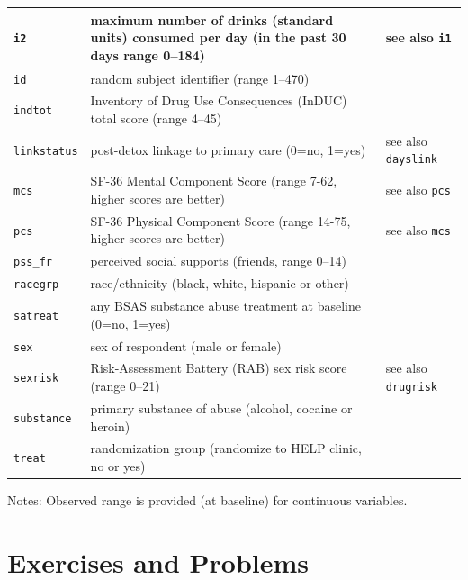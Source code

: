 \documentclass{tufte-book}\usepackage[]{graphicx}\usepackage[]{xcolor}
\renewcommand{\variable}[1]{{\color{black}\texttt{#1}}}
\begin{document}
\begin{longtable}{|p{2.1cm}|p{6.8cm}|p{3.5cm}|}
\variable{i2} & maximum number of drinks (standard units) consumed per day (in the past 30 days range 0--184) & see also \variable{i1}
\\ \hline
\variable{id} & random subject identifier (range 1--470) &
\\ \hline
\variable{indtot} & Inventory of Drug Use Consequences (InDUC) total score  (range 4--45)  &
\\ \hline
\variable{linkstatus} & post-detox linkage to primary care (0=no, 1=yes)  & see also \variable{dayslink}
\\ \hline
\variable{mcs} & SF-36 Mental Component Score  (range 7-62, higher scores are better)  & see also \variable{pcs}
\\ \hline
\variable{pcs} & SF-36 Physical Component Score  (range 14-75, higher scores are better)  & see also \variable{mcs}
\\ \hline
\variable{pss\_fr} & perceived social supports (friends, range 0--14) & 
\\ \hline
\variable{racegrp} & race/ethnicity (black, white, hispanic or other)  &  \\ \hline
\variable{satreat} & any BSAS substance abuse treatment at baseline (0=no, 1=yes)  &  \\ \hline
\variable{sex} & sex of respondent  (male or female)  & \\ \hline
\variable{sexrisk} & Risk-Assessment Battery (RAB) sex risk score  (range 0--21)  & see also \variable{drugrisk}
\\ \hline
\variable{substance} & primary substance of abuse (alcohol, cocaine or heroin) &
\\ \hline
\variable{treat} & randomization group (randomize to HELP clinic, no or yes) & 
\\ \hline
\end{longtable}
\noindent
Notes: Observed range is provided (at baseline) for continuous variables.



\chapter{Exercises and Problems}

\shipoutProblems






\printindex
\end{document}
